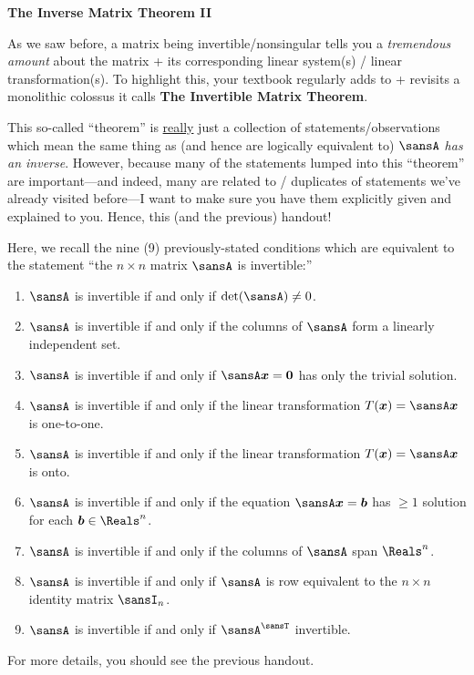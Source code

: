 \documentclass[12 pt]{article}
\begin{document}
\begin{center}
\Large{\textbf{The Inverse Matrix Theorem II}}
\end{center}

As we saw before, a matrix being invertible/nonsingular tells you a \textit{tremendous amount} about the matrix + its corresponding linear system(s) / linear transformation(s). To highlight this, your textbook regularly adds to + revisits a monolithic colossus it calls \textbf{The Invertible Matrix Theorem}. 

This so-called ``theorem'' is \ul{really} just a collection of statements/observations which mean the same thing as (and hence are logically equivalent to) \textit{$\sansA$ has an inverse}. However, because many of the statements lumped into this ``theorem'' are important---and indeed, many are related to / duplicates of statements we've already visited before---I want to make sure you have them explicitly given and explained to you. Hence, this (and the previous) handout!

Here, we recall the nine (9) previously-stated conditions which are equivalent to the statement ``the $n\times n$ matrix $\sansA$ is invertible:''
\begin{enumerate}[label=(\arabic*),itemsep=0.75mm,topsep=1.5mm,leftmargin=16mm]
	\item $\sansA$ is invertible if and only if $\det(\sansA)\neq 0$.
	\item $\sansA$ is invertible if and only if the columns of $\sansA$ form a linearly independent set.
	\item $\sansA$ is invertible if and only if $\sansA\vect{x}=\vect{0}$ has only the trivial solution.
	\item $\sansA$ is invertible if and only if the linear transformation $T(\vect{x})=\sansA\vect{x}$ is one-to-one.
	\item $\sansA$ is invertible if and only if the linear transformation $T(\vect{x})=\sansA\vect{x}$ is onto.
	\item $\sansA$ is invertible if and only if the equation $\sansA\vect{x}=\vect{b}$ has $\geq 1$ solution for each $\vect{b}\in\Reals^n$.
	\item $\sansA$ is invertible if and only if the columns of $\sansA$ span $\Reals^n$.
	\item $\sansA$ is invertible if and only if $\sansA$ is row equivalent to the $n\times n$ identity matrix $\sansI_n$.
	\item $\sansA$ is invertible if and only if $\sansA^\sansT$ invertible.
\end{enumerate}
For more details, you should see the previous handout.
\end{document}

